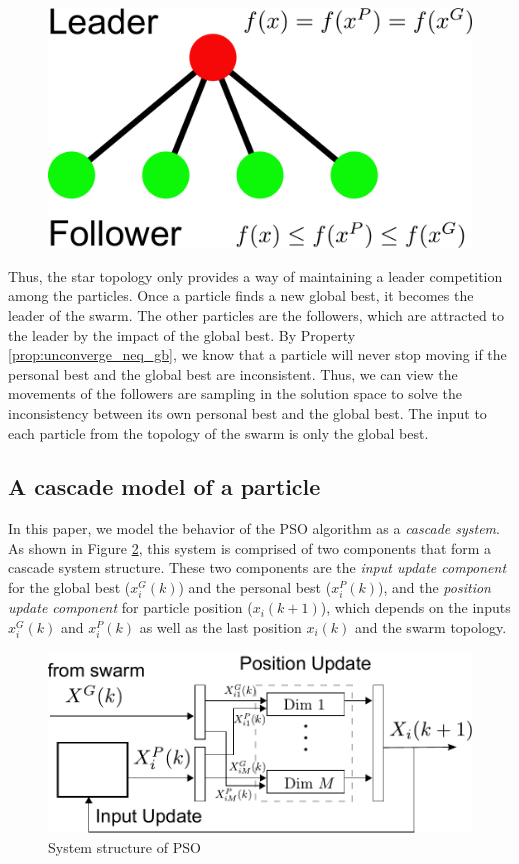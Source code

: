 \begin{figure}[tbph]
\centering
\includegraphics[width=0.5\linewidth]{./fig/leader_follower}
\caption{}
\label{fig:leader_follower}
\end{figure}

Thus, the star topology only provides a way of maintaining a leader competition among the particles.
Once a particle finds a new global best, it becomes the leader of the swarm.
The other particles are the followers, which are attracted to the leader by the impact of the global best.
By Property \ref{prop:unconverge_neq_gb}, we know that a particle will never stop moving if the personal best and the global best are inconsistent.
Thus, we can view the movements of the followers are sampling in the solution space to solve the inconsistency between its own personal best and the global best.
The input to each particle from the topology of the swarm is only the global best.

\subsection{A cascade model of a particle}

In this paper, we model the behavior of the PSO algorithm as a \emph{cascade system}.
As shown in Figure \ref{fig:sys_flow}, this system is comprised of two components that form a cascade system structure.
These two components are the 
\emph{input update component} for the global best ($ x^{G}_{i}(k) $) and the personal best ($ x^{P}_{i}(k) $), and the 
\emph{position update component} for particle position ($ x_{i}(k+1) $), which depends on the inputs $ x^{G}_{i}(k) $ and $ x^{P}_{i}(k) $ as well as the last position $ x_{i}(k) $ and the swarm topology.

\begin{figure}
\centering
\includegraphics[width=0.7\linewidth]{./fig/sys_flow.pdf}
\caption{System structure of PSO}
\label{fig:sys_flow}
\end{figure}

